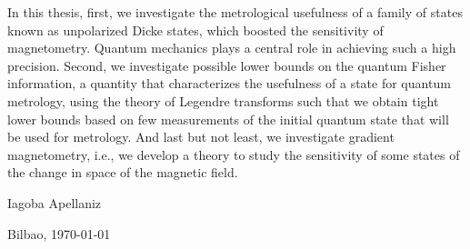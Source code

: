 In this thesis, first, we investigate the metrological usefulness of a family of states known as unpolarized Dicke states, which boosted the sensitivity of magnetometry.
Quantum mechanics plays a central role in achieving such a high precision.
Second, we investigate possible lower bounds on the quantum Fisher information, a quantity that characterizes the usefulness of a state for quantum metrology, using the theory of Legendre transforms such that we obtain tight lower bounds based on few measurements of the initial quantum state that will be used for metrology.
And last but not least, we investigate gradient magnetometry, i.e., we develop a theory to study the sensitivity of some states of the change in space of the magnetic field.

\begin{flushright}
  Iagoba Apellaniz

  Bilbao, \today
\end{flushright}

